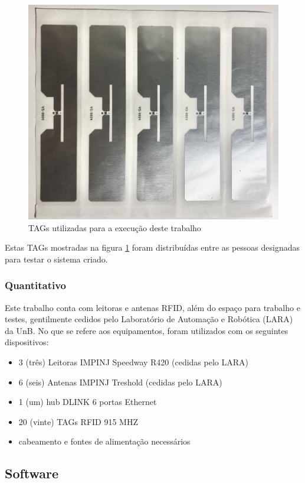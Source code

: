  \begin{figure}[H]
    \centering
    \includegraphics[width=0.8\linewidth]{figs/Metodologia/TAGsRFID.jpeg}
    \caption{TAGs utilizadas para a execução deste trabalho}
    \label{fig:TAGsused}
\end{figure}
 
 Estas TAGs mostradas na figura \ref{fig:TAGsused} foram distribuídas entre as pessoas designadas para testar o sistema criado. %
 
 \subsubsection{Quantitativo}
 
 Este trabalho conta com leitoras e antenas RFID, além do espaço para trabalho e testes, gentilmente cedidos pelo Laboratório de Automação e Robótica (LARA) da UnB. No que se refere aos equipamentos, foram utilizados com os seguintes dispositivos:
 
 \begin{itemize}
     \item 3 (três) Leitoras IMPINJ Speedway R420 (cedidas pelo LARA)
     \item 6 (seis) Antenas IMPINJ Treshold (cedidas pelo LARA)
     \item 1 (um) hub DLINK 6 portas Ethernet
     \item 20 (vinte) TAGs RFID 915 MHZ
     \item cabeamento e fontes de alimentação necessários
 \end{itemize}
 
 \subsection{Software}
 
